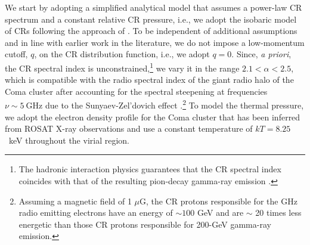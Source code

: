 \documentclass[12pt,manuscript]{aastex}
\newcommand{\rmn}{\mathrm}
\begin{document}
We start by adopting a simplified analytical model that assumes a power-law CR spectrum and a
constant relative CR pressure, i.e., we adopt the isobaric model of CRs following the approach
of \citet{article:PfrommerEnsslin:2004b}. To be independent of additional assumptions and in line
with earlier work in the literature, we do not impose a low-momentum cutoff, $q$, on the CR
distribution function, i.e., we adopt $q=0$. Since, {\em a priori}, the CR spectral index is
unconstrained,\footnote{The hadronic interaction physics guarantees that the CR spectral index
coincides with that of the resulting pion-decay gamma-ray emission
\citep[see discussion in][]{article:PfrommerEnsslin:2004b}.} we vary it in the range
$2.1<\alpha<2.5$, which is compatible with the radio spectral index of the giant radio halo of the
Coma cluster after accounting for the spectral steepening at frequencies $\nu\sim5~\rmn{GHz}$ due to
the Sunyaev-Zel'dovich effect \citep{article:Ensslin:2002,
article:PfrommerEnsslin:2004b}.\footnote{Assuming a magnetic field of 1 $\mu$G, the CR protons
responsible for the GHz radio emitting electrons have an energy of $\sim100$ GeV and are $\sim$ 20
times less energetic than those CR protons responsible for 200-GeV gamma-ray emission.} To model
the thermal pressure, we adopt the electron density profile for the Coma cluster that has been
inferred from ROSAT X-ray observations \citep{article:BrielHenryBohringer:1992} and use a constant
temperature of $kT= 8.25$~keV throughout the virial region.
\end{document}
